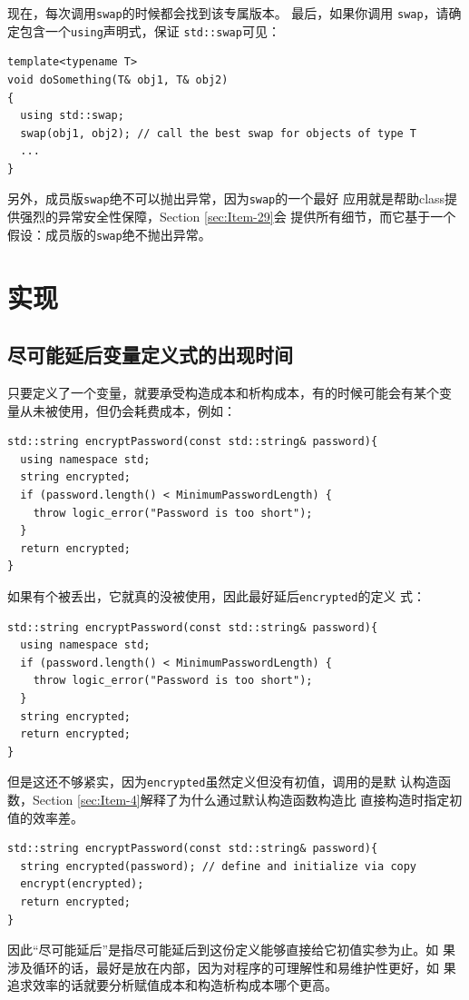 现在，每次调用\texttt{swap}的时候都会找到该专属版本。 最后，如果你调用
\texttt{swap}，请确定包含一个\texttt{using}声明式，保证
\texttt{std::swap}可见：

\begin{verbatim}
template<typename T>
void doSomething(T& obj1, T& obj2)
{
  using std::swap;
  swap(obj1, obj2); // call the best swap for objects of type T
  ...
}
\end{verbatim}

另外，成员版\texttt{swap}绝不可以抛出异常，因为\texttt{swap}的一个最好
应用就是帮助class提供强烈的异常安全性保障，Section \ref{sec:Item-29}会
提供所有细节，而它基于一个假设：成员版的\texttt{swap}绝不抛出异常。

\clearpage
\section{实现}

\subsection{尽可能延后变量定义式的出现时间}
\label{sec:Item-26}

只要定义了一个变量，就要承受构造成本和析构成本，有的时候可能会有某个变
量从未被使用，但仍会耗费成本，例如：

\begin{verbatim}
std::string encryptPassword(const std::string& password){
  using namespace std;
  string encrypted;
  if (password.length() < MinimumPasswordLength) {
    throw logic_error("Password is too short");
  }
  return encrypted;
}
\end{verbatim}

如果有个被丢出，它就真的没被使用，因此最好延后\texttt{encrypted}的定义
式：
\begin{verbatim}
std::string encryptPassword(const std::string& password){
  using namespace std;
  if (password.length() < MinimumPasswordLength) {
    throw logic_error("Password is too short");
  }
  string encrypted;
  return encrypted;
}
\end{verbatim}
但是这还不够紧实，因为\texttt{encrypted}虽然定义但没有初值，调用的是默
认构造函数，Section \ref{sec:Item-4}解释了为什么通过默认构造函数构造比
直接构造时指定初值的效率差。
\begin{verbatim}
std::string encryptPassword(const std::string& password){
  string encrypted(password); // define and initialize via copy
  encrypt(encrypted);
  return encrypted;
}
\end{verbatim}
因此“尽可能延后”是指尽可能延后到这份定义能够直接给它初值实参为止。如
果涉及循环的话，最好是放在内部，因为对程序的可理解性和易维护性更好，如
果追求效率的话就要分析赋值成本和构造析构成本哪个更高。

